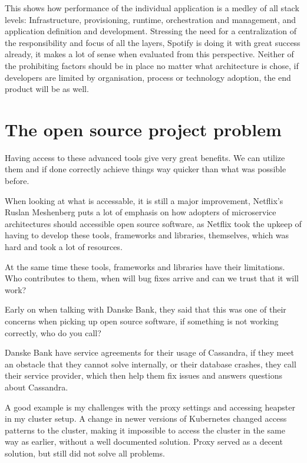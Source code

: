 This shows how performance of the individual application is a medley of all stack levels: Infrastructure, provisioning, runtime, orchestration and management, and application definition and development. Stressing the need for a centralization of the responsibility and focus of all the layers, Spotify is doing it with great success already, it makes a lot of sense when evaluated from this perspective. Neither of the prohibiting factors should be in place no matter what architecture is chose, if developers are limited by organisation, process or technology adoption, the end product will be as well.


\section{The open source project problem}
Having access to these advanced tools give very great benefits. We can utilize them and if done correctly achieve things way quicker than what was possible before.

When looking at what is accessable, it is still a major improvement, Netflix's Ruslan Meshenberg\cite{meshenberg2016microservices} puts a lot of emphasis on how adopters of microservice architectures should accessible open source software, as Netflix took the upkeep of having to develop these tools, frameworks and libraries, themselves, which was hard and took a lot of resources.

At the same time these tools, frameworks and libraries have their limitations. Who contributes to them, when will bug fixes arrive and can we trust that it will work?

Early on when talking with Danske Bank, they said that this was one of their concerns when picking up open source software, if something is not working correctly, who do you call?

Danske Bank have service agreements for their usage of Cassandra, if they meet an obstacle that they cannot solve internally, or their database crashes, they call their service provider, which then help them fix issues and answers questions about Cassandra.

A good example is my challenges with the proxy settings and accessing heapster in my cluster setup. A change in newer versions of Kubernetes changed access patterns to the cluster, making it impossible to access the cluster in the same way as earlier, without a well documented solution. Proxy served as a decent solution, but still did not solve all problems.

